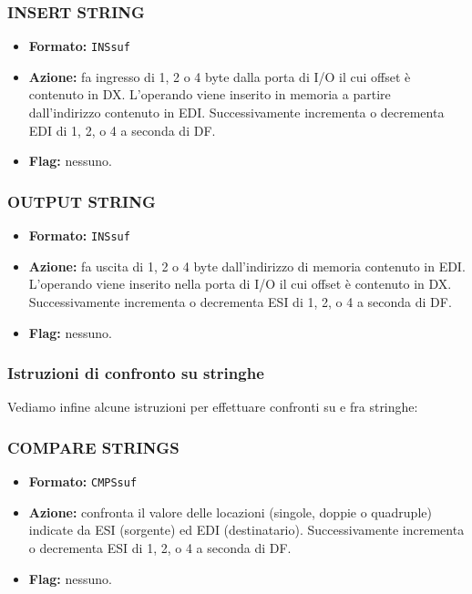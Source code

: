 \documentclass[a4paper,11pt]{article}
\begin{document}
\subsubsection{INSERT STRING}
\begin{itemize}
	\item \textbf{Formato:} \lstinline|INSsuf| 
	\item \textbf{Azione:} fa ingresso di 1, 2 o 4 byte dalla porta di I/O il cui offset è contenuto in DX. L'operando viene inserito in memoria a partire dall'indirizzo contenuto in EDI.
		Successivamente incrementa o decrementa EDI di 1, 2, o 4 a seconda di DF.
	\item \textbf{Flag:} nessuno.
\end{itemize}

\subsubsection{OUTPUT STRING}
\begin{itemize}
	\item \textbf{Formato:} \lstinline|INSsuf| 
	\item \textbf{Azione:} fa uscita di 1, 2 o 4 byte dall'indirizzo di memoria contenuto in EDI. L'operando viene inserito nella porta di I/O il cui offset è contenuto in DX.
		Successivamente incrementa o decrementa ESI di 1, 2, o 4 a seconda di DF. 

	\item \textbf{Flag:} nessuno.
\end{itemize}

\subsubsection{Istruzioni di confronto su stringhe}
Vediamo infine alcune istruzioni per effettuare confronti su e fra stringhe:

\subsubsection{COMPARE STRINGS}
\begin{itemize}
	\item \textbf{Formato:} \lstinline|CMPSsuf| 
	\item \textbf{Azione:} confronta il valore delle locazioni (singole, doppie o quadruple) indicate da ESI (sorgente) ed EDI (destinatario). 
		Successivamente incrementa o decrementa ESI di 1, 2, o 4 a seconda di DF. 

	\item \textbf{Flag:} nessuno.
\end{itemize}
\end{document}
